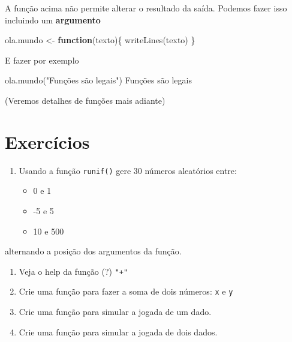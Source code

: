 \documentclass[
  10pt,
  a4paper]{book}
\newenvironment{Shaded}{\begin{snugshade}}{\end{snugshade}}
\newcommand{\ControlFlowTok}[1]{\textcolor[rgb]{0.13,0.29,0.53}{\textbf{#1}}}
\newcommand{\FunctionTok}[1]{\textcolor[rgb]{0.00,0.00,0.00}{#1}}
\newcommand{\NormalTok}[1]{#1}
\newcommand{\OtherTok}[1]{\textcolor[rgb]{0.56,0.35,0.01}{#1}}
\newcommand{\StringTok}[1]{\textcolor[rgb]{0.31,0.60,0.02}{#1}}
\providecommand{\tightlist}{%
  \setlength{\itemsep}{0pt}\setlength{\parskip}{0pt}}
\begin{document}
A função acima não permite alterar o resultado da saída. Podemos fazer
isso incluindo um \textbf{argumento}

\begin{Shaded}
\begin{Highlighting}[]
\NormalTok{ola.mundo }\OtherTok{\textless{}{-}} \ControlFlowTok{function}\NormalTok{(texto)\{}
    \FunctionTok{writeLines}\NormalTok{(texto)}
\NormalTok{\}}
\end{Highlighting}
\end{Shaded}

E fazer por exemplo

\begin{Shaded}
\begin{Highlighting}[]
\FunctionTok{ola.mundo}\NormalTok{(}\StringTok{"Funções são legais"}\NormalTok{)}
\NormalTok{Funções são legais}
\end{Highlighting}
\end{Shaded}

(Veremos detalhes de funções mais adiante)

\hypertarget{exercuxedcios-1}{%
\section*{Exercícios}\label{exercuxedcios-1}}


\begin{enumerate}
\def\labelenumi{\arabic{enumi}.}
\tightlist
\item
  Usando a função \texttt{runif()} gere \(30\) números aleatórios entre:

  \begin{itemize}
  \tightlist
  \item
    0 e 1
  \item
    -5 e 5
  \item
    10 e 500
  \end{itemize}
\end{enumerate}

alternando a posição dos argumentos da função.

\begin{enumerate}
\def\labelenumi{\arabic{enumi}.}
\setcounter{enumi}{1}
\tightlist
\item
  Veja o help da função (?) \texttt{"+"}
\item
  Crie uma função para fazer a soma de dois números: \texttt{x} e \texttt{y}
\item
  Crie uma função para simular a jogada de um dado.
\item
  Crie uma função para simular a jogada de dois dados.
\end{enumerate}
\end{document}
